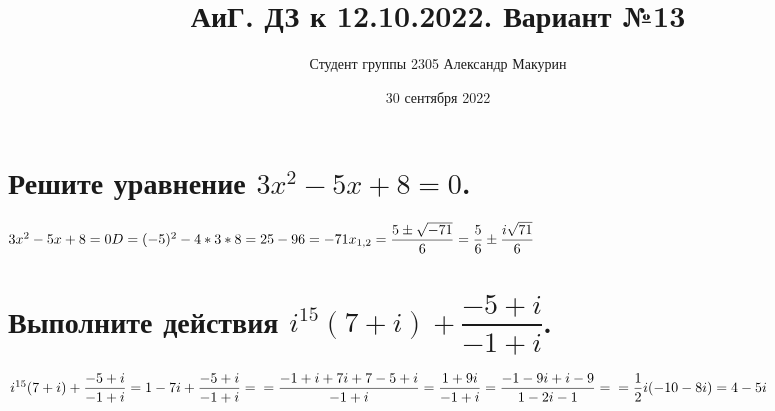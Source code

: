 \documentclass[12pt]{article}
\title{АиГ. ДЗ к 12.10.2022. Вариант №13}
\author{Студент группы 2305 Александр Макурин}
\date{30 сентября 2022}
\begin{document}
\maketitle

\begin{sloppypar}

    \section{Решите уравнение $3x^2 - 5x + 8 = 0$.}
    $
        3x^2-5x+8=0 \\
        D = (-5)^2 - 4*3*8 = 25 - 96 = -71 \\
        x_{1,2} = \dfrac{5 \pm \sqrt{-71}}{6} = \dfrac56 \pm \dfrac{i\sqrt{71}}{6}
    $


    \section{Выполните действия $i^{15}(7 + i) + \dfrac{-5 + i}{-1 + i}$.}
    $
        i^{15}(7+i) + \dfrac{-5 + i}{-1 + i} = 1 - 7i + \dfrac{-5 + i}{-1 + i} = \\
        = \dfrac{-1 + i + 7i + 7 - 5 + i}{-1 + i} = \dfrac{1 + 9i}{-1 + i} = \dfrac{-1 - 9i + i - 9}{1 - 2i - 1} = \\
        = \dfrac12i(-10 - 8i) = 4 - 5i
    $



\end{sloppypar}
\end{document}
